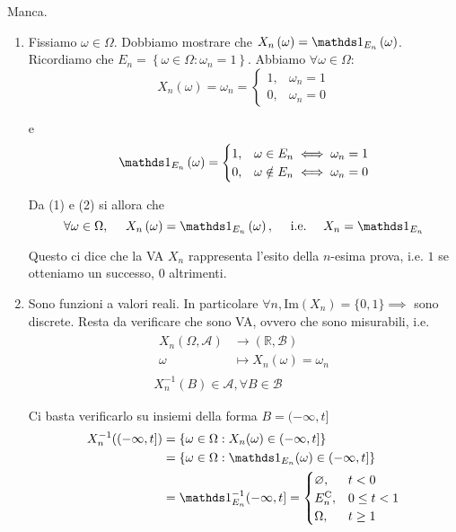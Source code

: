 Manca.
\Soluzione
\begin{enumerate}
\item Fissiamo $\omega \in \Omega $. Dobbiamo mostrare che $X_{n}\left( \omega \right) =\Ind_{E_{n}}\left( \omega \right)$. Ricordiamo che $E_{n} =\left\{\omega \in \Omega :\omega _{n} =1\right\}$. Abbiamo $\forall \omega \in \Omega $:\begin{equation}
X_{n}\left( \omega \right) =\omega _{n} =\begin{cases}
1, & \omega _{n} =1\\
0, & \omega _{n} =0
\end{cases}
\end{equation}

e
\begin{equation}
\Ind_{E_{n}}\left( \omega \right) =\begin{cases}
1, & \omega \in E_{n} \iff \omega _{n} =1\\
0, & \omega \notin E_{n} \iff \omega _{n} =0
\end{cases}
\end{equation}

Da (1) e (2) si allora che
\begin{equation*}
\forall \omega \in \Omega ,\ \ \ \ X_{n}\left( \omega \right) =\Ind_{E_{n}}\left( \omega \right) ,\ \ \ \ \text{i.e.} \ \ \ \ X_{n} =\Ind_{E_{n}}
\end{equation*}

\begin{oss}
Questo ci dice che la VA $X_{n}$ rappresenta l'esito della $n$-esima prova, i.e. $1$ se otteniamo un successo, $0$ altrimenti.
\end{oss}
\item Sono funzioni a valori reali. In particolare $\forall n,\mathrm{Im}( X_{n}) =\{0,1\} \implies $ sono discrete. Resta da verificare che sono VA, ovvero che sono misurabili, i.e.\begin{gather*}
\begin{aligned}
X_{n}( \Omega ,\mathcal{A}) & \rightarrow (\mathbb{R} ,\mathcal{B})\\
\omega  & \mapsto X_{n}( \omega ) =\omega _{n}
\end{aligned}\\
X_{n}^{-1}( B) \in \mathcal{A} ,\forall B\in \mathcal{B}
\end{gather*}

Ci basta verificarlo su insiemi della forma $B=( -\infty ,t]$\begin{align*}
X_{n}^{-1}(( -\infty ,t]) & =\{\omega \in \Omega :X_{n}( \omega ) \in ( -\infty ,t]\}\\
 & =\{\omega \in \Omega :\Ind_{E_{n}}( \omega ) \in ( -\infty ,t]\}\\
 & =\Ind_{E_{n}}^{-1}( -\infty ,t] =\begin{cases}
\emptyset , & t< 0\\
E_{n}\comp , & 0\leq t< 1\\
\Omega , & t\geq 1
\end{cases}
\end{align*}


\end{enumerate}
